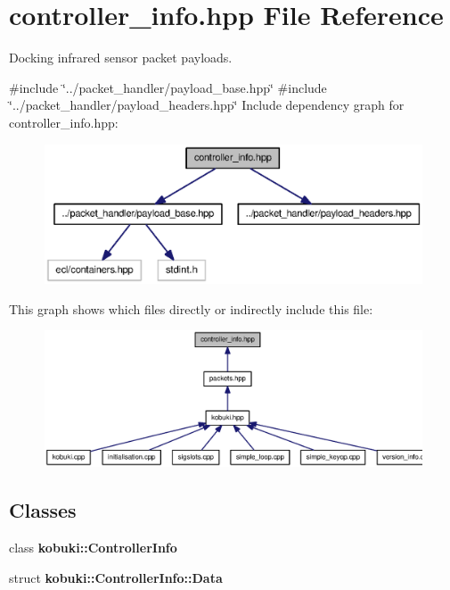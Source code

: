 \section{controller\-\_\-info.\-hpp \-File \-Reference}
\label{controller__info_8hpp}


\-Docking infrared sensor packet payloads.  


{\ttfamily \#include \char`\"{}../packet\-\_\-handler/payload\-\_\-base.\-hpp\char`\"{}}\*
{\ttfamily \#include \char`\"{}../packet\-\_\-handler/payload\-\_\-headers.\-hpp\char`\"{}}\*
\-Include dependency graph for controller\-\_\-info.\-hpp\-:
\nopagebreak
\begin{figure}[H]
\begin{center}
\leavevmode
\includegraphics[width=350pt]{controller__info_8hpp__incl}
\end{center}
\end{figure}
\-This graph shows which files directly or indirectly include this file\-:
\nopagebreak
\begin{figure}[H]
\begin{center}
\leavevmode
\includegraphics[width=350pt]{controller__info_8hpp__dep__incl}
\end{center}
\end{figure}
\subsection*{\-Classes}
\begin{DoxyCompactItemize}
\item 
class {\bf kobuki\-::\-Controller\-Info}
\item 
struct {\bf kobuki\-::\-Controller\-Info\-::\-Data}
\end{DoxyCompactItemize}
